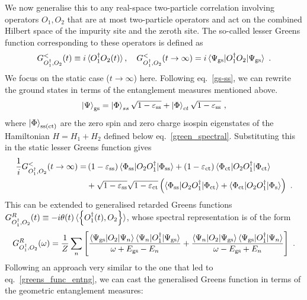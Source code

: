 We now generalise this to any real-space two-particle correlation involving operators \(O_1, O_2\) that are at most two-particle operators and act on the combined Hilbert space of the impurity site and the zeroth site. The so-called lesser Greens function corresponding to these operators is defined as 
\begin{eqnarray}\label{lesser-gf}
	G^<_{O_1^\dagger, O_2}(t) \equiv i\braket{O_1^\dagger O_2(t)}, \quad G^<_{O_1^\dagger, O_2}(t\to \infty) = i\braket{\Psi_\text{gs}|O_1^\dagger O_2 | \Psi_\text{gs}} ~.
\end{eqnarray}
We focus on the static case (\(t \to \infty\)) here. Following eq.~\eqref{gs-ss}, we can rewrite the ground states in terms of the entanglement measures mentioned above.
\begin{eqnarray}
	\ket{\Psi}_\text{gs} = \ket{\Phi}_{ss}\sqrt{1 - \varepsilon_\text{ss}} + \ket{\Phi}_{ct}\sqrt{1 - \varepsilon_\text{ss}}~,
\end{eqnarray}
where \(\ket{\Phi}_\text{ss(ct)}\) are the zero spin and zero charge isospin eigenstates of the Hamiltonian \(H = H_1 + H_2\) defined below eq.~\eqref{green_spectral}.
Substituting this in the static lesser Greens function gives
\begin{eqnarray}
	\label{gen-entng}
	\frac{1}{i}G^<_{O_1^\dagger, O_2}(t\to \infty) =& \left(1 - \varepsilon_\text{ss}\right) \braket{\Phi_\text{ss} | O_2 O_1^\dagger | \Phi_\text{ss}} + \left(1 - \varepsilon_\text{ct}\right) \braket{\Phi_\text{ct} | O_2 O_1^\dagger | \Phi_\text{ct}} \nonumber \\
				      &+ \sqrt{1 - \varepsilon_\text{ss}}\sqrt{1 - \varepsilon_\text{ct}}\left(\braket{\Phi_\text{ss} | O_2 O_1^\dagger | \Phi_\text{ct}} + \braket{\Phi_\text{ct} | O_2 O_1^\dagger | \Phi_\text{s}}\right)~.
\end{eqnarray}
This can be extended to generalised retarded Greens functions \(G^R_{O_1^\dagger,O_2}(t) \equiv -i\theta(t) \braket{\left\{O_1^\dagger(t), O_2\right\}}\), whose spectral representation is of the form
\begin{eqnarray}
	G^R_{O_1^\dagger,O_2}(\omega) = \frac{1}{Z}\sum_n \left[ \frac{\braket{\Psi_\text{gs} | O_2 | \Psi_n}\braket{\Psi_n | O_1^\dagger | \Psi_\text{gs}}}{\omega + E_\text{gs} - E_n} + \frac{\braket{\Psi_n | O_2 | \Psi_\text{gs}}\braket{\Psi_\text{gs} | O_1^\dagger | \Psi_n}}{\omega - E_\text{gs} + E_n}\right] ~.
\end{eqnarray}
Following an approach very similar to the one that led to eq.~\eqref{greens_func_entng}, we can cast the generalised Greens function in terms of the geometric entanglement measures:
